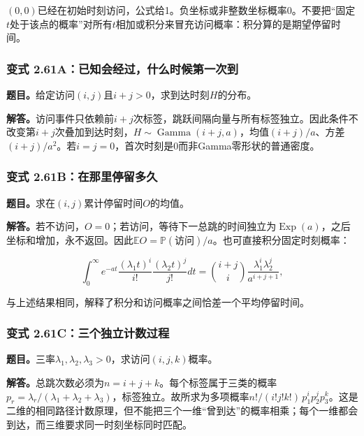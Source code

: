 \documentclass[12pt,a4paper,UTF8,fontset=fandol]{ctexart}
\begin{document}
\((0,0)\)已经在初始时刻访问，公式给1。负坐标或非整数坐标概率0。不要把``固定\(t\)处于该点的概率''对所有\(t\)相加或积分来冒充访问概率：积分算的是期望停留时间。

\subsubsection{变式
2.61A：已知会经过，什么时候第一次到}\label{ux53d8ux5f0f-2.61aux5df2ux77e5ux4f1aux7ecfux8fc7ux4ec0ux4e48ux65f6ux5019ux7b2cux4e00ux6b21ux5230}

\textbf{题目。}给定访问\((i,j)\)且\(i+j>0\)，求到达时刻\(H\)的分布。

\textbf{解答。}访问事件只依赖前\(i+j\)次标签，跳跃间隔向量与所有标签独立。因此条件不改变第\(i+j\)次叠加到达时刻，\(H\sim\operatorname{Gamma}(i+j,a)\)，均值\((i+j)/a\)、方差\((i+j)/a^2\)。若\(i=j=0\)，首次时刻是0而非Gamma零形状的普通密度。

\subsubsection{变式
2.61B：在那里停留多久}\label{ux53d8ux5f0f-2.61bux5728ux90a3ux91ccux505cux7559ux591aux4e45}

\textbf{题目。}求在\((i,j)\)累计停留时间\(O\)的均值。

\textbf{解答。}若不访问，\(O=0\)；若访问，等待下一总跳的时间独立为\(\operatorname{Exp}(a)\)，之后坐标和增加，永不返回。因此\(\mathbb EO=\mathbb P(\text{访问})/a\)。也可直接积分固定时刻概率：

\[\int_0^\infty e^{-at}\frac{(\lambda_1t)^i}{i!}
\frac{(\lambda_2t)^j}{j!}dt
=\binom{i+j}{i}\frac{\lambda_1^i\lambda_2^j}{a^{i+j+1}},\]

与上述结果相同，解释了积分和访问概率之间恰差一个平均停留时间。

\subsubsection{变式
2.61C：三个独立计数过程}\label{ux53d8ux5f0f-2.61cux4e09ux4e2aux72ecux7acbux8ba1ux6570ux8fc7ux7a0b}

\textbf{题目。}三率\(\lambda_1,\lambda_2,\lambda_3>0\)，求访问\((i,j,k)\)概率。

\textbf{解答。}总跳次数必须为\(n=i+j+k\)。每个标签属于三类的概率\(p_r=\lambda_r/(\lambda_1+\lambda_2+\lambda_3)\)，标签独立。故所求为多项概率\(n!/(i!j!k!)\,p_1^ip_2^jp_3^k\)。这是二维的相同路径计数原理，但不能把三个一维``曾到达''的概率相乘；每个一维都会到达，而三维要求同一时刻坐标同时匹配。
\end{document}
